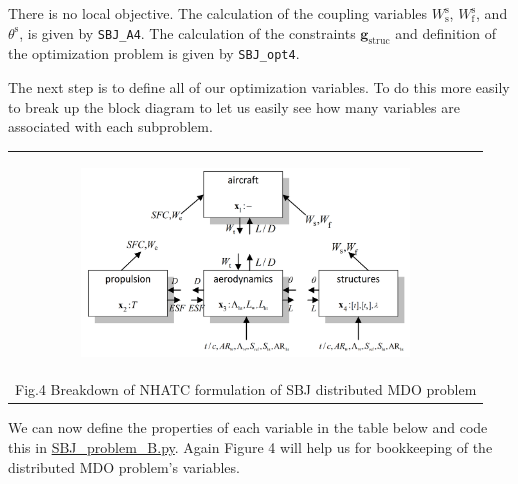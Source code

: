 \documentclass[11pt]{article}
\begin{document}
There is no local objective. The calculation of the coupling variables
\(W_{\mathrm{s}}^{\mathrm{s}}\), \(W_{\mathrm{f}}^{\mathrm{s}}\), and
\(\theta^{\mathrm{s}}\), is given by \texttt{SBJ\_A4}. The calculation
of the constraints \(\mathbf{g}_{\mathrm{struc}}\) and definition of the
optimization problem is given by \texttt{SBJ\_opt4}.

The next step is to define all of our optimization variables. To do this
more easily to break up the block diagram to let us easily see how many
variables are associated with each subproblem.

\begin{longtable}[]{@{}c@{}}
    \toprule
    \endhead
    \begin{minipage}[t]{0.97\columnwidth}\centering
        \begin{figure}
            \centering
            \includegraphics[height=5cm]{images/SBJ_schematics_004.png}
        \end{figure}\strut
    \end{minipage}\tabularnewline
    \begin{minipage}[t]{0.97\columnwidth}\centering
        Fig.4 Breakdown of NHATC formulation of SBJ distributed MDO
problem\strut
    \end{minipage}\tabularnewline
    \bottomrule
\end{longtable}

We can now define the properties of each variable in the table below and
code this in \url{SBJ_problem_B.py}. Again Figure 4 will help us for
bookkeeping of the distributed MDO problem's variables.
\end{document}
